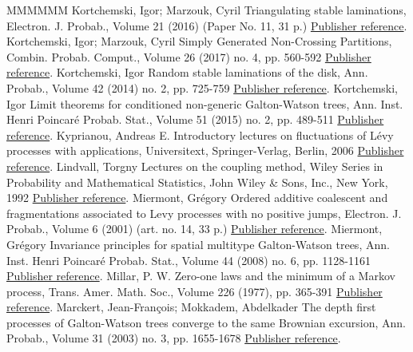 \begin{thebibliography}{MMMMMM}
 Kortchemski, Igor; Marzouk, Cyril Triangulating stable laminations, Electron. J. Probab., Volume 21 (2016) (Paper No. 11, 31 p.) \href{https://ahl.centre-mersenne.org/item/AHL_2018__1__149_0/#KM16}{Publisher reference}.
 Kortchemski, Igor; Marzouk, Cyril Simply Generated Non-Crossing Partitions, Combin. Probab. Comput., Volume 26 (2017) no. 4, pp. 560-592 \href{https://ahl.centre-mersenne.org/item/AHL_2018__1__149_0/#KM17}{Publisher reference}.
 Kortchemski, Igor Random stable laminations of the disk, Ann. Probab., Volume 42 (2014) no. 2, pp. 725-759 \href{https://ahl.centre-mersenne.org/item/AHL_2018__1__149_0/#Kor14}{Publisher reference}.
 Kortchemski, Igor Limit theorems for conditioned non-generic Galton-Watson trees, Ann. Inst. Henri Poincaré Probab. Stat., Volume 51 (2015) no. 2, pp. 489-511 \href{https://ahl.centre-mersenne.org/item/AHL_2018__1__149_0/#Kor15}{Publisher reference}.
 Kyprianou, Andreas E. Introductory lectures on fluctuations of Lévy processes with applications, Universitext, Springer-Verlag, Berlin, 2006 \href{https://ahl.centre-mersenne.org/item/AHL_2018__1__149_0/#Kyp06}{Publisher reference}.
 Lindvall, Torgny Lectures on the coupling method, Wiley Series in Probability and Mathematical Statistics, John Wiley \& Sons, Inc., New York, 1992 \href{https://ahl.centre-mersenne.org/item/AHL_2018__1__149_0/#Lin92}{Publisher reference}.
 Miermont, Grégory Ordered additive coalescent and fragmentations associated to Levy processes with no positive jumps, Electron. J. Probab., Volume 6 (2001) (art. no. 14, 33 p.) \href{https://ahl.centre-mersenne.org/item/AHL_2018__1__149_0/#Mie01}{Publisher reference}.
 Miermont, Grégory Invariance principles for spatial multitype Galton-Watson trees, Ann. Inst. Henri Poincaré Probab. Stat., Volume 44 (2008) no. 6, pp. 1128-1161 \href{https://ahl.centre-mersenne.org/item/AHL_2018__1__149_0/#Mie08b}{Publisher reference}.
 Millar, P. W. Zero-one laws and the minimum of a Markov process, Trans. Amer. Math. Soc., Volume 226 (1977), pp. 365-391 \href{https://ahl.centre-mersenne.org/item/AHL_2018__1__149_0/#Mil77}{Publisher reference}.
 Marckert, Jean-François; Mokkadem, Abdelkader The depth first processes of Galton-Watson trees converge to the same Brownian excursion, Ann. Probab., Volume 31 (2003) no. 3, pp. 1655-1678 \href{https://ahl.centre-mersenne.org/item/AHL_2018__1__149_0/#MM03}{Publisher reference}.

\end{thebibliography}
